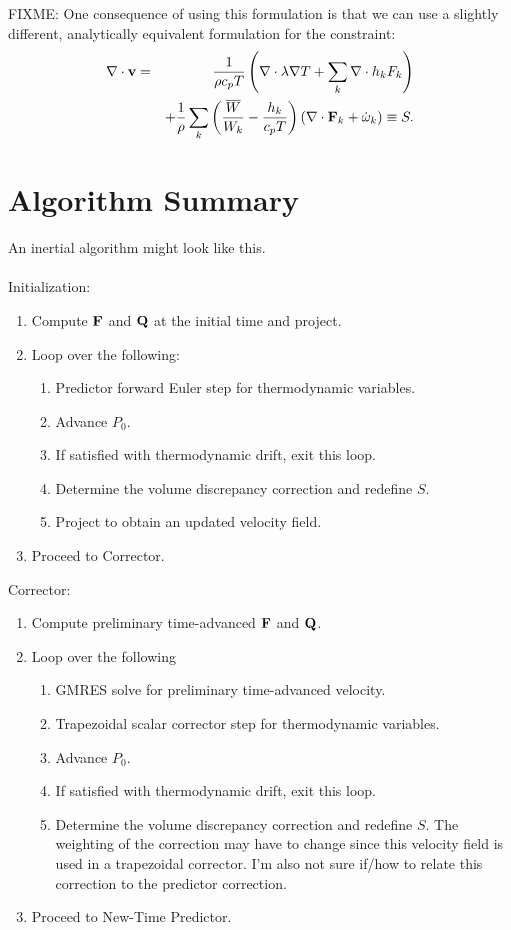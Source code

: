 \documentclass[final]{siamltex}
\def\Fb {{\bf F}}
\def\Qb {{\bf Q}}
\def\vb {{\bf v}}
\begin{document}
FIXME: One consequence of using this formulation is that we can use a slightly different, 
analytically equivalent formulation for the constraint:
\begin{eqnarray}
\nabla\cdot\vb &=& \frac{1}{\rho c_p T}\left(\nabla\cdot\lambda\nabla T + \sum_k\nabla\cdot h_k F_k\right)\nonumber\\
&& + \frac{1}{\rho}\sum_k\left(\frac{\overline{W}}{W_k} - \frac{h_k}{c_p T}\right)\left(\nabla\cdot\Fb_k + \dot\omega_k\right) \equiv S.
\end{eqnarray}

\section{Algorithm Summary}
An inertial algorithm might look like this.\\ \\
Initialization:\\
\begin{enumerate}
\item Compute $\Fb$ and $\Qb$ at the initial time and project.
\item Loop over the following:
\begin{enumerate}
\item Predictor forward Euler step for thermodynamic variables.
\item Advance $P_0$.
\item If satisfied with thermodynamic drift, exit this loop.
\item Determine the volume discrepancy correction and redefine $S$.
\item Project to obtain an updated velocity field.
\end{enumerate}
\item Proceed to Corrector.\\
\end{enumerate}
Corrector:\\
\begin{enumerate}
\item Compute preliminary time-advanced $\Fb$ and $\Qb$.
\item Loop over the following
\begin{enumerate}
\item GMRES solve for preliminary time-advanced velocity.
\item Trapezoidal scalar corrector step for thermodynamic variables.
\item Advance $P_0$.
\item If satisfied with thermodynamic drift, exit this loop.
\item Determine the volume discrepancy correction and redefine $S$.  The weighting of the
correction may have to change since this velocity field is used in a trapezoidal corrector.
I'm also not sure if/how to relate this correction to the predictor correction.
\end{enumerate}
\item Proceed to New-Time Predictor.\\
\end{enumerate}
\end{document}
